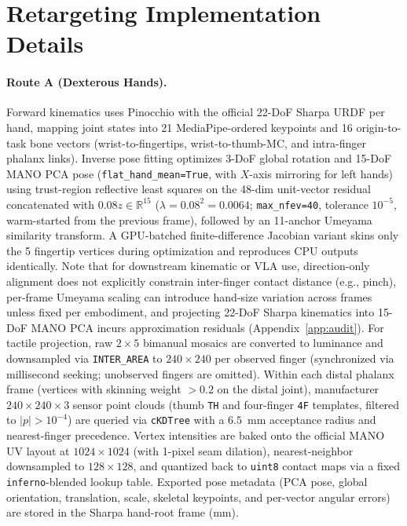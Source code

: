 \section{Retargeting Implementation Details}
\label{app:retarget}

\paragraph{Route A (Dexterous Hands).}
Forward kinematics uses Pinocchio \citep{carpentier2019pinocchio} with the official 22-DoF Sharpa URDF per hand, mapping joint states into 21 MediaPipe-ordered keypoints and 16 origin-to-task bone vectors (wrist-to-fingertips, wrist-to-thumb-MC, and intra-finger phalanx links).
Inverse pose fitting optimizes 3-DoF global rotation and 15-DoF MANO PCA pose (\texttt{flat\_hand\_mean=True}, with $X$-axis mirroring for left hands) using trust-region reflective least squares on the 48-dim unit-vector residual concatenated with $0.08z \in \mathbb{R}^{15}$ ($\lambda = 0.08^2 = 0.0064$; \texttt{max\_nfev=40}, tolerance $10^{-5}$, warm-started from the previous frame), followed by an 11-anchor Umeyama similarity transform.
A GPU-batched finite-difference Jacobian variant skins only the 5 fingertip vertices during optimization and reproduces CPU outputs identically.
Note that for downstream kinematic or VLA use, direction-only alignment does not explicitly constrain inter-finger contact distance (e.g., pinch), per-frame Umeyama scaling can introduce hand-size variation across frames unless fixed per embodiment, and projecting 22-DoF Sharpa kinematics into 15-DoF MANO PCA incurs approximation residuals (Appendix~\ref{app:audit}).
For tactile projection, raw $2\times 5$ bimanual mosaics are converted to luminance and downsampled via \texttt{INTER\_AREA} to $240\times 240$ per observed finger (synchronized via millisecond seeking; unobserved fingers are omitted).
Within each distal phalanx frame (vertices with skinning weight $>0.2$ on the distal joint), manufacturer $240\times 240\times 3$ sensor point clouds (thumb \texttt{TH} and four-finger \texttt{4F} templates, filtered to $|p| > 10^{-4}$) are queried via \texttt{cKDTree} with a $6.5$~mm acceptance radius and nearest-finger precedence.
Vertex intensities are baked onto the official MANO UV layout at $1024\times 1024$ (with 1-pixel seam dilation), nearest-neighbor downsampled to $128\times 128$, and quantized back to \texttt{uint8} contact maps via a fixed \texttt{inferno}-blended lookup table.
Exported pose metadata (PCA pose, global orientation, translation, scale, skeletal keypoints, and per-vector angular errors) are stored in the Sharpa hand-root frame (mm).

